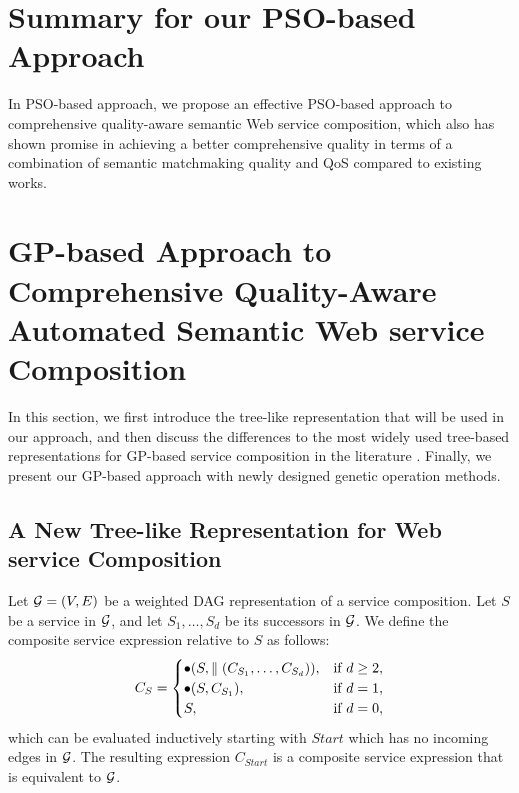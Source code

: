 \section{Summary for our PSO-based Approach}\label{summary1}

In PSO-based approach, we propose an effective PSO-based approach to comprehensive quality-aware semantic Web service composition, which also has shown promise in achieving a better comprehensive quality in terms of a combination of semantic matchmaking quality and QoS compared to existing works.
\section{GP-based Approach to Comprehensive Quality-Aware Automated Semantic Web service Composition}\label{GPApproach}

In this section, we first introduce the tree-like representation that will be used in our approach, and then discuss the differences to the most widely used tree-based representations for GP-based service composition in the literature \cite{gupta2015optimization,da2016genetic,yu2013adaptive}. Finally, we present our GP-based approach with newly designed genetic operation methods.
\subsection{A New Tree-like Representation for Web service Composition}\label{representation} 

Let $\mathcal{G}=(V,E)$ be a weighted DAG representation of a service composition. Let $S$ be a service in $\mathcal{G}$, and let $S_1,\ldots,S_d$ be its successors in $\mathcal{G}$. We define the composite service expression relative to $S$ as follows: 
\begin{equation}
\label{eq_s_expression}
    C_S=
    \begin{cases}
      \bullet(S,\parallel(C_{S_1},\ldots,C_{S_d})), & \text{if $d\ge 2$}, \\
      \bullet(S,C_{S_1}), & \text{if $d=1$}, \\
      S, & \text{if $d=0$},
    \end{cases}
\end{equation}
which can be evaluated inductively starting with $Start$ which has no incoming edges in $\mathcal{G}$. The resulting expression $C_{Start}$ is a composite service expression that is equivalent to $\mathcal{G}$.

